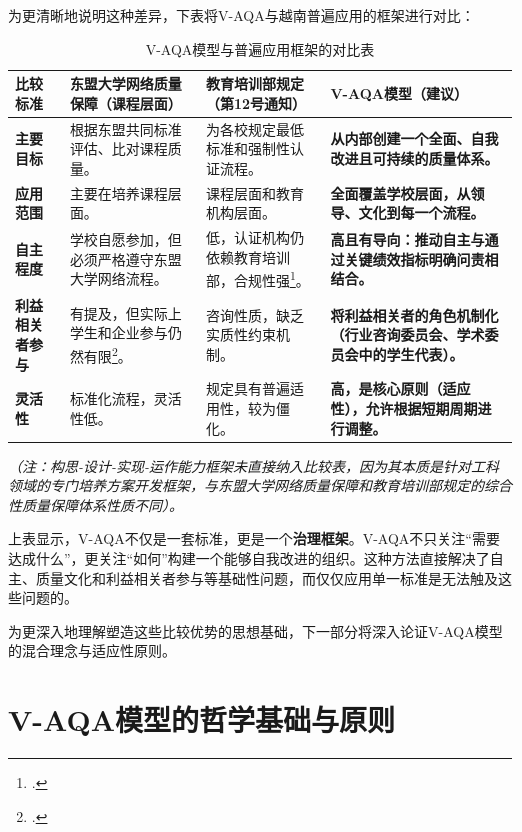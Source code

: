 为更清晰地说明这种差异，下表将V-AQA与越南普遍应用的框架进行对比：

\begin{table}[h!]
\centering
\caption{V-AQA模型与普遍应用框架的对比表}
\label{tab:doi_sanh_vqa}
\begin{tabular}{|p{3cm}|p{3.5cm}|p{3.5cm}|p{3.5cm}|}
\hline
\textbf{比较标准} & \textbf{东盟大学网络质量保障（课程层面）} & \textbf{教育培训部规定（第12号通知）} & \textbf{V-AQA模型（建议）} \\
\hline
\textbf{主要目标} & 根据东盟共同标准评估、比对课程质量。 & 为各校规定最低标准和强制性认证流程。 & \textbf{从内部创建一个全面、自我改进且可持续的质量体系。} \\
\hline
\textbf{应用范围} & 主要在培养课程层面。 & 课程层面和教育机构层面。 & \textbf{全面覆盖学校层面，从领导、文化到每一个流程。} \\
\hline
\textbf{自主程度} & 学校自愿参加，但必须严格遵守东盟大学网络流程。 & 低，认证机构仍依赖教育培训部，合规性强\footcite{ncdt_journal_219}。 & \textbf{高且有导向：推动自主与通过关键绩效指标明确问责相结合。} \\
\hline
\textbf{利益相关者参与} & 有提及，但实际上学生和企业参与仍然有限\footcite{pmc_article_9127449}。 & 咨询性质，缺乏实质性约束机制。 & \textbf{将利益相关者的角色机制化（行业咨询委员会、学术委员会中的学生代表）。} \\
\hline
\textbf{灵活性} & 标准化流程，灵活性低。 & 规定具有普遍适用性，较为僵化。 & \textbf{高，是核心原则（适应性），允许根据短期周期进行调整。} \\
\hline
\end{tabular}
\end{table}

\textit{（注：构思-设计-实现-运作能力框架未直接纳入比较表，因为其本质是针对工科领域的专门培养方案开发框架，与东盟大学网络质量保障和教育培训部规定的综合性质量保障体系性质不同）。}

上表显示，V-AQA不仅是一套标准，更是一个\textbf{治理框架}。V-AQA不只关注“需要达成什么”，更关注“如何”构建一个能够自我改进的组织。这种方法直接解决了自主、质量文化和利益相关者参与等基础性问题，而仅仅应用单一标准是无法触及这些问题的。

为更深入地理解塑造这些比较优势的思想基础，下一部分将深入论证V-AQA模型的混合理念与适应性原则。




\section{V-AQA模型的哲学基础与原则}
\label{sec:triet_ly_nguyen_tac_vqa}

